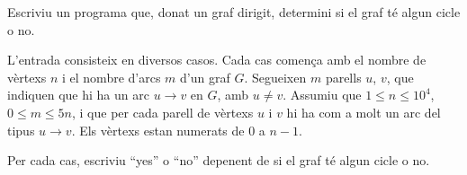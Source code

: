 

\Statement

Escriviu un programa que, donat un graf dirigit, determini si el graf té algun cicle o no.

\Input

L'entrada consisteix en diversos casos. Cada cas comença amb el nombre de vèrtexs $n$ i el nombre d'arcs $m$ d'un graf $G$. Segueixen $m$ parells $u$, $v$, que indiquen que hi ha un arc $u \rightarrow v$ en $G$, amb $u \neq v$. Assumiu que $1 \leq n \leq 10^{4}$, $0 \leq m \leq 5n$, i que per cada parell de vèrtexs $u$ i $v$ hi ha com a molt un arc del tipus $u \rightarrow v$. Els vèrtexs estan numerats de $0$ a $n-1$.

\Output

Per cada cas, escriviu ``yes'' o ``no'' depenent de si el graf té algun cicle o no.

\Sample
